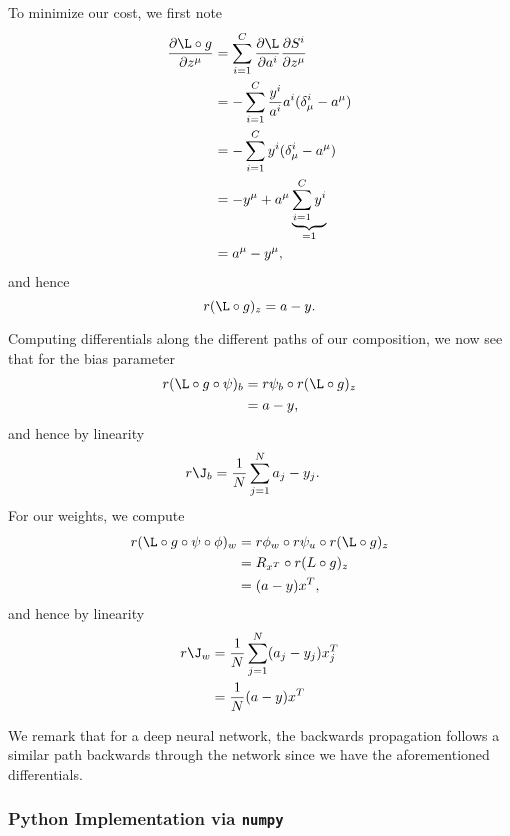 To minimize our cost, we first note
\begin{align*}
	\frac{\partial\L\circ g}{\partial z^\mu}&=\sum_{i=1}^C\frac{\partial\L}{\partial a^i}\frac{\partial S^i}{\partial z^\mu}\\
	&=-\sum_{i=1}^C\frac{y^i}{a^i}a^i(\delta^i_\mu-a^\mu)\\
	&=-\sum_{i=1}^Cy^i(\delta^i_\mu-a^\mu)\\
	&=-y^\mu+a^\mu\underbrace{\sum_{i=1}^Cy^i}_{=1}\\
	&=a^\mu-y^\mu,
\end{align*}
and hence
$$r(\L\circ g)_z=a-y.$$

Computing differentials along the different paths of our composition, we now see that for the bias parameter
\begin{align*}
	r(\L\circ g\circ\psi)_b&=r\psi_b\circ r(\L\circ g)_z\\
	&=a-y,
\end{align*}
and hence by linearity
\begin{align*}
	r\J_b&=\frac{1}{N}\sum_{j=1}^Na_j-y_j.
\end{align*}
For our weights, we compute
\begin{align*}
	r(\L\circ g\circ\psi\circ\phi)_w&=r\phi_w\circ r\psi_u\circ r(\L\circ g)_z\\
	&=R_{x^T}\circ r(L\circ g)_z\\
	&=(a-y)x^T,
\end{align*}
and hence by linearity
\begin{align*}
	r\J_w &=\frac{1}{N}\sum_{j=1}^N(a_j-y_j)x_j^T\\
	&=\frac{1}{N}(a-y)x^T
\end{align*}

We remark that for a deep neural network, the backwards propagation follows a similar path backwards through the network since we have the aforementioned differentials.



\subsubsection{Python Implementation via \texttt{numpy}}



















